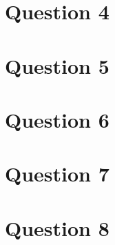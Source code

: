 \documentclass{article}
\begin{document}
\section{Question 4}

\section{Question 5}

\section{Question 6}

\section{Question 7}

\section{Question 8}
\end{document}
